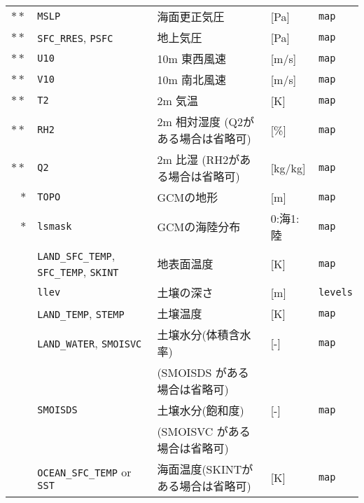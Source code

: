 {\begin{table}[!h]
\begin{center}
\begin{tabularx}{150mm}{rl|l|l|X}
$\ast\ast$ &\verb|MSLP|    & 海面更正気圧                      & [Pa]     & \verb|map| \\
$\ast\ast$ &\verb|SFC_RRES|, \verb|PSFC|    & 地上気圧                          & [Pa]     & \verb|map| \\
$\ast\ast$ &\verb|U10|     & 10m 東西風速                      & [m/s]    & \verb|map| \\
$\ast\ast$ &\verb|V10|     & 10m 南北風速                      & [m/s]    & \verb|map| \\
$\ast\ast$ &\verb|T2|      & 2m 気温                           & [K]      & \verb|map| \\
$\ast\ast$ &\verb|RH2|     & 2m 相対湿度 (Q2がある場合は省略可) & [\%]    & \verb|map| \\
$\ast\ast$ &\verb|Q2|      & 2m 比湿 (RH2がある場合は省略可)    & [kg/kg] & \verb|map| \\
    $\ast$ &\verb|TOPO|    & GCMの地形                         & [m]      & \verb|map| \\
    $\ast$ &\verb|lsmask|  & GCMの海陸分布                     & 0:海1:陸 & \verb|map| \\
           &\verb|LAND_SFC_TEMP|, \verb|SFC_TEMP|, \verb|SKINT|   & 地表面温度                        & [K]      & \verb|map| \\
           &\verb|llev|    & 土壌の深さ                        & [m]      & \verb|levels| \\
           &\verb|LAND_TEMP|, \verb|STEMP|   & 土壌温度                          & [K]      & \verb|map| \\
           &\verb|LAND_WATER|, \verb|SMOISVC| & 土壌水分(体積含水率)              & [-]      & \verb|map| \\
           &               & (SMOISDS がある場合は省略可)      &          &            \\
           &\verb|SMOISDS| & 土壌水分(飽和度)                  & [-]      & \verb|map| \\
           &               & (SMOISVC がある場合は省略可)      &          &            \\
           &\verb|OCEAN_SFC_TEMP| or \verb|SST|     & 海面温度(SKINTがある場合は省略可) & [K]      & \verb|map| \\ \hline
\end{tabularx}
\end{center}
\end{table}
}
